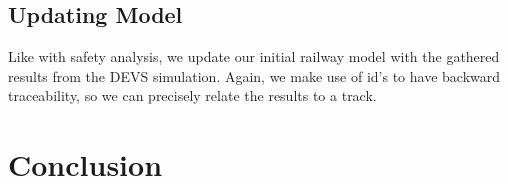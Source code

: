 \documentclass{article}
\begin{document}
\subsection{Updating Model}

Like with safety analysis, we update our initial railway model with the gathered results from the DEVS simulation. Again, we make use of id's to have backward traceability, so we can precisely relate the results to a track.

\section{Conclusion}


\nocite{*}

\end{document}
